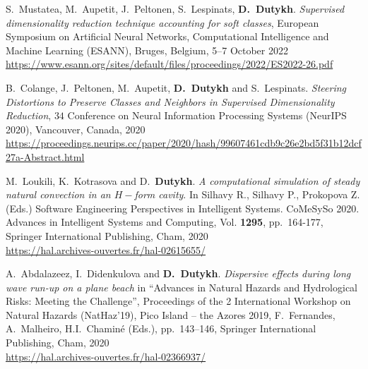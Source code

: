 \begin{etaremune}



  \item S.~Mustatea, M.~Aupetit, J.~Peltonen, S.~Lespinats, \textbf{D.~Dutykh}. \textit{Supervised dimensionality reduction technique accounting for soft classes}, European Symposium on Artificial Neural Networks, Computational Intelligence and Machine Learning (ESANN), Bruges, Belgium, 5--7 October 2022 \\ %
  \url{https://www.esann.org/sites/default/files/proceedings/2022/ES2022-26.pdf}


  
  \item B.~Colange, J.~Peltonen, M.~Aupetit, \textbf{D.~Dutykh} and S.~Lespinats. \textit{Steering Distortions to Preserve Classes and Neighbors in Supervised Dimensionality Reduction}, $34$ Conference on Neural Information Processing Systems (NeurIPS 2020), Vancouver, Canada, 2020 \\ %
  {\small \url{https://proceedings.neurips.cc/paper/2020/hash/99607461cdb9c26e2bd5f31b12dcf27a-Abstract.html}}
  
  \item M.~Loukili, K.~Kotrasova and D.~\textbf{Dutykh}. \textit{A computational simulation of steady natural convection in an $H-$form cavity}. In Silhavy R., Silhavy P., Prokopova Z. (Eds.) Software Engineering Perspectives in Intelligent Systems. CoMeSySo 2020. Advances in Intelligent Systems and Computing, Vol. \textbf{1295}, pp.~164-177, Springer International Publishing, Cham, 2020 \\ %
  \url{https://hal.archives-ouvertes.fr/hal-02615655/}

  \item A.~Abdalazeez, I.~Didenkulova and \textbf{D.~Dutykh}. \textit{Dispersive effects during long wave run-up on a plane beach} in ``Advances in Natural Hazards and Hydrological Risks: Meeting the Challenge'', Proceedings of the 2 International Workshop on Natural Hazards (NatHaz'19), Pico Island -- the Azores 2019, F.~Fernandes, A.~Malheiro, H.I.~Chamin\'e (Eds.), pp.~143--146, Springer International Publishing, Cham, 2020 \\ %
  \url{https://hal.archives-ouvertes.fr/hal-02366937/}
  

\end{etaremune}
